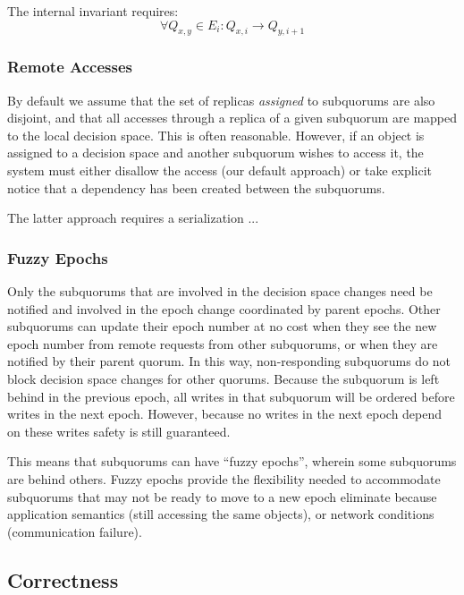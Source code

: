 \documentclass[sigconf]{acmart}
\begin{document}
\begin{definition}
  The internal invariant requires:
  \begin{displaymath}
  \forall Q_{x,y} \in E_i : Q_{x,i} \rightarrow Q_{y,i+1}
  \end{displaymath}
\end{definition}

\subsubsection{Remote Accesses}

By default we assume that the set of replicas \textit{assigned} to subquorums are also
disjoint, and that all accesses through a replica of a given subquorum are mapped to the
local decision space.
This is often reasonable.
However, if an object is assigned to a decision space and another subquorum wishes to
access it, the system must either disallow the access (our default approach) or take
explicit notice that a dependency has been created between the subquorums.

The latter approach requires a serialization ... 

\subsubsection{Fuzzy Epochs}

Only the subquorums that are involved in the  decision space changes need be notified and
involved in the epoch change coordinated by parent epochs.
Other subquorums can update their epoch number at no cost when they see the new epoch
number from remote requests from other subquorums, or when they are notified by their
parent quorum.
In this way, non-responding subquorums do not block decision space changes for other
quorums.
Because the subquorum is left behind in the previous epoch, all writes in that subquorum
will be ordered before writes in the next epoch.
However, because no writes in the next epoch depend on these writes safety is still
guaranteed.

This means that subquorums can have ``fuzzy epochs'', wherein some subquorums are behind
others.
Fuzzy epochs provide the flexibility needed to accommodate subquorums that may not be
ready
to move to a new epoch eliminate because application semantics (still accessing the same
objects), or network conditions (communication failure).

\subsection{Correctness}
\end{document}
